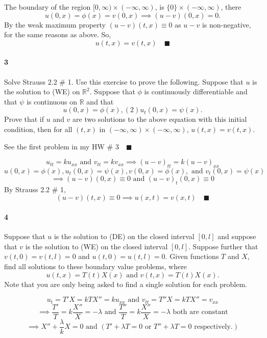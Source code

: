 \documentclass{article}
\newcommand\R{\mathbb{R}}
\begin{document}

The boundary of the region $[0, ∞) × (−∞,∞)$, is $\{0\}× (−∞,∞)$, there
\[u(0,x) = \phi(x) = v(0, x)\implies (u-v)(0,x) = 0.\]
By the weak maximum property $(u-v)(t,x)\equiv 0$ as $u-v$ is
non-negative, for the same reasons as above. So,\[ u(t, x) = v(t,x)\quad \blacksquare\]

\paragraph{3} Solve Strauss 2.2 \# 1. Use this exercise to prove the following. Suppose that
$u$ is the solution to (WE) on $\R^2$. Suppose that $\phi$ is continuously differentiable and that $\psi$ is
continuous on $\R$ and that
\[u(0, x) = \phi(x), (2) u_t(0, x) = \psi(x).\]
Prove that if $u$ and $v$ are two solutions to the above equation with this initial condition, then
for all $(t, x)$ in $(−∞, ∞) × (−∞,∞)$,
$u(t, x) = v(t, x).$

 See the first problem in my HW \#
3$\quad\blacksquare$

\[u_{tt} = k u_{xx}\text{ and }v_{tt} = kv_{xx} \implies (u-v)_{tt} = k(u-v)_{xx}\]
\[u(0, x) = \phi(x), u_t(0, x) = \psi(x), v(0, x) = \phi(x), \text{ and } v_t(0, x) = \psi(x)\]
\[\implies (u-v)(0,x)\equiv 0\text{ and } (u-v)_t(0,x) \equiv 0\]
By Strauss 2.2 \# 1, \[(u-v)(t,x) \equiv 0\implies u(x,t) =
  v(x,t)\quad\blacksquare\]

\paragraph{4} Suppose that $u$ is the solution to (DE) on the closed interval $[0, l]$ and suppose
that $v$ is the solution to (WE) on the closed interval $[0, l]$. Suppose further that
$v(t, 0) = v(t, l) = 0$ and $u(t, 0) = u(t, l) = 0$.
Given functions $T$ and $X$, find all solutions to these boundary value problems, where
\[u(t, x) = T(t)X(x)\text{ and }v(t, x) = T(t)X(x).\]
Note that you are only being asked to find a single solution for each
problem.


\[u_t = T'X = kTX'' = ku_{xx}\text{ and }v_{tt} = T''X = kTX''=v_{xx}\]
\[\implies \frac{T'}{T} = k\frac{X''}{X} = -\lambda \text{ and } \frac{T''}{T} =
  k\frac{X''}{X} = -\lambda\text{ both are constant}\]
\[\implies X''+ \frac{\lambda}{k} X = 0 \text{ and } \left(T'
  +\lambda T = 0\text{ or }  T''+ \lambda T = 0 \text{ respectively.}
\right)\]
\end{document}
